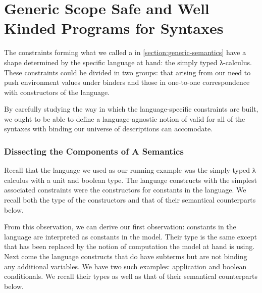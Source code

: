 \chapter{Generic Scope Safe and Well Kinded Programs for Syntaxes}
\label{chapter:generic-semantics}

The constraints forming what we called a  in
\cref{section:generic-semantics} have a shape determined by the
specific language at hand: the simply typed λ-calculus.
%
These constraints could be divided in two groups: that arising
from our need to push environment values under binders and those
in one-to-one correspondence with constructors of the language.

By carefully studying the way in which the language-specific
constraints are built, we ought to be able to define a
language-agnostic notion of  valid for all of
the syntaxes with binding our universe of descriptions can
accomodate.

\subsection{Dissecting the Components of A Semantics}

Recall that the language we used as our running example was the
simply-typed λ-calculus with a unit and boolean type.
%
The language constructs with the simplest associated 
constraints were the constructors for constants in the language. We
recall both the type of the constructors and that of their semantical
counterparts below.

\noindent\begin{minipage}{0.4\textwidth}
\end{minipage}\begin{minipage}{0.6\textwidth}
  \begin{AgdaSuppressSpace}
  \end{AgdaSuppressSpace}
\end{minipage}

From this observation, we can derive our first observation:
constants in the language are interpreted as constants in
the model. Their type is the same except that  has
been replaced by the notion of computation  the model
at hand is using.
%
Next come the language constructs that do have subterms but are not
binding any additional variables. We have two such examples: application
and boolean conditionals. We recall their types as well as that of their
semantical counterparts below.

